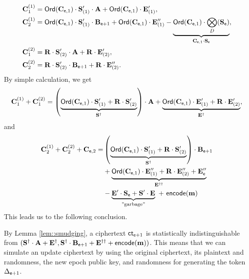 \documentclass{fundam}
\begin{document}
\begin{align*}
	 \mathbf{C}_{1}^{(1)} &= \mathsf{Ord}(\mathbf{C}_{\mathsf{e} , 1})\cdot\mathbf{S}_{(1)}'  \cdot \mathbf{A} + \mathsf{Ord}(\mathbf{C}_{\mathsf{e} , 1})\cdot \mathbf{E}_{(1)}' ,     \\
	 \mathbf{C}_{2}^{(1)} &=   \mathsf{Ord}(\mathbf{C}_{\mathsf{e} , 1})\cdot \mathbf{S}_{(1)}' \cdot \mathbf{B}_{\mathsf{e}+1} + \mathsf{Ord}(\mathbf{C}_{\mathsf{e} , 1})\cdot \mathbf{E}_{(1)}''  -   \underbrace{\mathsf{Ord}(\mathbf{C}_{\mathsf{e} , 1})\cdot \bigotimes_{D} (\mathbf{S}_{\mathsf{e}}) }_{\mathbf{C}_{\mathsf{e} , 1}\cdot \mathbf{S}_{\mathsf{e}}}, \\
	 	\mathbf{C}_{1}^{(2)} &= \mathbf{R}\cdot \mathbf{S}_{(2)}' \cdot \mathbf{A} + \mathbf{R}\cdot \mathbf{E}_{(2)}'  ,\\
	 \mathbf{C}_{2}^{(2)} &= \mathbf{R}\cdot \mathbf{S}_{(2)}' \cdot \mathbf{B}_{\mathsf{e}+1} + \mathbf{R}\cdot \mathbf{E}_{(2)}''.
\end{align*}
By simple calculation, we get
\begin{align*}
 \mathbf{C}_{1}^{(1)} + \mathbf{C}_{1}^{(2)}  = \left(  \underbrace{\mathsf{Ord}(\mathbf{C}_{\mathsf{e} , 1})\cdot \mathbf{S}_{(1)}'  +  \mathbf{R}\cdot \mathbf{S}_{(2)}' }_{\mathbf{S}^{\dagger}}  \right) \cdot \mathbf{A}  + \underbrace{\mathsf{Ord}(\mathbf{C}_{\mathsf{e} , 1})\cdot \mathbf{E}_{(1)}' + \mathbf{R}\cdot \mathbf{E}_{(2)}' }_{\mathbf{E}^{\dagger}} ,
\end{align*}
and
\begin{align*}
 \mathbf{C}_{2}^{(1)}  +  \mathbf{C}_{2}^{(2)}  + \mathbf{C}_{\mathsf{e},2}  = & \left(  \underbrace{\mathsf{Ord}(\mathbf{C}_{\mathsf{e} , 1})\cdot \mathbf{S}_{(1)}'  +  \mathbf{R}\cdot \mathbf{S}_{(2)}' }_{\mathbf{S}^{\dagger}}  \right) \cdot \mathbf{B}_{\mathsf{e}+1} \\
 & + \underbrace{\mathsf{Ord}(\mathbf{C}_{\mathsf{e} , 1})\cdot \mathbf{E}_{(1)}'' + \mathbf{R}\cdot \mathbf{E}_{(2)}'' +\mathbf{E}_{\mathsf{e}}''}_{\mathbf{E}^{\dagger\dagger}} \\
 &- \underbrace{\mathbf{E}'\cdot \mathbf{S}_{\mathsf{e}} + \mathbf{S}' \cdot \mathbf{E}}_{\text{''garbage''}}~ +  ~\mathsf{encode}(\mathbf{m})
\end{align*}
%
This leads us to the following conclusion.
\begin{concl}\label{conc::01}
	By Lemma \ref{lem::smudging},  a ciphertext $\mathsf{ct}_{\mathsf{e}+1}$ is statistically indistinguishable from $(\mathbf{S}^{\dagger}\cdot\mathbf{A} + \mathbf{E}^{\dagger},  \mathbf{S}^{\dagger}\cdot\mathbf{B}_{\mathsf{e}+1} + \mathbf{E}^{\dagger\dagger} +  \mathsf{encode}(\mathbf{m}))$. This means that we can simulate an update ciphertext by using the original ciphertext, its plaintext and randomness, the new epoch public key, and randomness for generating the token $\Delta_{\mathsf{e}+1}$.
\end{concl}
\end{document}
